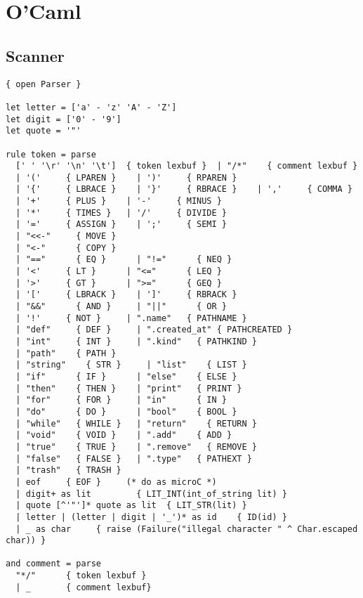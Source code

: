 \documentclass[11pt]{article}
\begin{document}
\section{O'Caml}

\subsection{Scanner}
\label{sec:scanner}

\begin{listing}[H]
  \begin{verbatim}
{ open Parser }

let letter = ['a' - 'z' 'A' - 'Z']
let digit = ['0' - '9']
let quote = '"'

rule token = parse
  [' ' '\r' '\n' '\t']  { token lexbuf }  | "/*"    { comment lexbuf }
  | '('     { LPAREN }    | ')'     { RPAREN }
  | '{'     { LBRACE }    | '}'     { RBRACE }    | ','     { COMMA }
  | '+'     { PLUS }    | '-'     { MINUS }
  | '*'     { TIMES }   | '/'     { DIVIDE }
  | '='     { ASSIGN }    | ';'     { SEMI }
  | "<<-"     { MOVE }
  | "<-"      { COPY }
  | "=="      { EQ }      | "!="      { NEQ }
  | '<'     { LT }      | "<="      { LEQ }
  | '>'     { GT }      | ">="      { GEQ }
  | '['     { LBRACK }    | ']'     { RBRACK }
  | "&&"      { AND }     | "||"      { OR }
  | '!'     { NOT }     | ".name"   { PATHNAME }
  | "def"     { DEF }     | ".created_at" { PATHCREATED }
  | "int"     { INT }     | ".kind"   { PATHKIND }
  | "path"    { PATH }
  | "string"    { STR }     | "list"    { LIST }
  | "if"      { IF }      | "else"    { ELSE }
  | "then"    { THEN }    | "print"   { PRINT }
  | "for"     { FOR }     | "in"      { IN }
  | "do"      { DO }      | "bool"    { BOOL }
  | "while"   { WHILE }   | "return"    { RETURN }
  | "void"    { VOID }    | ".add"    { ADD }
  | "true"    { TRUE }    | ".remove"   { REMOVE }
  | "false"   { FALSE }   | ".type"   { PATHEXT }
  | "trash"   { TRASH }
  | eof     { EOF }     (* do as microC *)
  | digit+ as lit         { LIT_INT(int_of_string lit) }
  | quote [^'"']* quote as lit  { LIT_STR(lit) }
  | letter | (letter | digit | '_')* as id    { ID(id) }
  | _ as char     { raise (Failure("illegal character " ^ Char.escaped char)) }

and comment = parse
  "*/"      { token lexbuf }
  | _       { comment lexbuf}
  \end{verbatim}
\end{listing}
\end{document}
